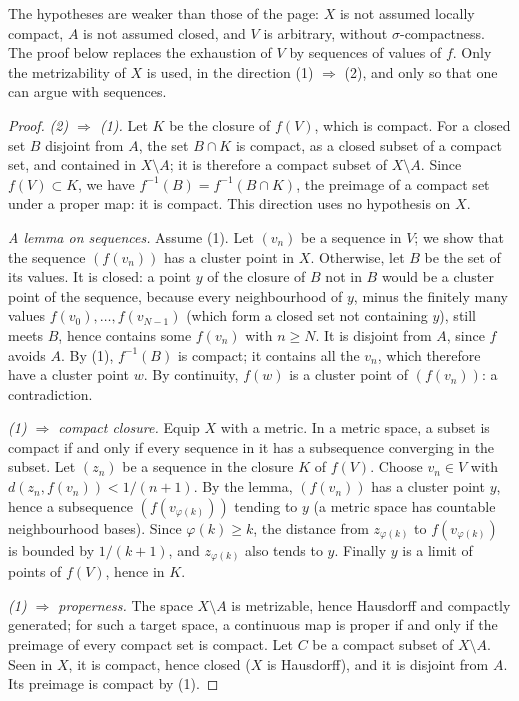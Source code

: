 \noindent The hypotheses are weaker than those of the page: $X$ is not assumed locally compact, $A$ is not assumed closed, and $V$ is arbitrary, without $\sigma$-compactness. The proof below replaces the exhaustion of $V$ by sequences of values of $f$. Only the metrizability of $X$ is used, in the direction (1) $\Rightarrow$ (2), and only so that one can argue with sequences.

\begin{proof}
\emph{(2) $\Rightarrow$ (1).} Let $K$ be the closure of $f(V)$, which is compact. For a closed set $B$ disjoint from $A$, the set $B \cap K$ is compact, as a closed subset of a compact set, and contained in $X \setminus A$; it is therefore a compact subset of $X \setminus A$. Since $f(V) \subset K$, we have $f^{-1}(B) = f^{-1}(B \cap K)$, the preimage of a compact set under a proper map: it is compact. This direction uses no hypothesis on $X$.

\emph{A lemma on sequences.} Assume (1). Let $(v_n)$ be a sequence in $V$; we show that the sequence $(f(v_n))$ has a cluster point in $X$. Otherwise, let $B$ be the set of its values. It is closed: a point $y$ of the closure of $B$ not in $B$ would be a cluster point of the sequence, because every neighbourhood of $y$, minus the finitely many values $f(v_0), \dots, f(v_{N-1})$ (which form a closed set not containing $y$), still meets $B$, hence contains some $f(v_n)$ with $n \ge N$. It is disjoint from $A$, since $f$ avoids $A$. By (1), $f^{-1}(B)$ is compact; it contains all the $v_n$, which therefore have a cluster point $w$. By continuity, $f(w)$ is a cluster point of $(f(v_n))$: a contradiction.

\emph{(1) $\Rightarrow$ compact closure.} Equip $X$ with a metric. In a metric space, a subset is compact if and only if every sequence in it has a subsequence converging in the subset. Let $(z_n)$ be a sequence in the closure $K$ of $f(V)$. Choose $v_n \in V$ with $d(z_n, f(v_n)) < 1/(n+1)$. By the lemma, $(f(v_n))$ has a cluster point $y$, hence a subsequence $(f(v_{\varphi(k)}))$ tending to $y$ (a metric space has countable neighbourhood bases). Since $\varphi(k) \ge k$, the distance from $z_{\varphi(k)}$ to $f(v_{\varphi(k)})$ is bounded by $1/(k+1)$, and $z_{\varphi(k)}$ also tends to $y$. Finally $y$ is a limit of points of $f(V)$, hence in $K$.

\emph{(1) $\Rightarrow$ properness.} The space $X \setminus A$ is metrizable, hence Hausdorff and compactly generated; for such a target space, a continuous map is proper if and only if the preimage of every compact set is compact. Let $C$ be a compact subset of $X \setminus A$. Seen in $X$, it is compact, hence closed ($X$ is Hausdorff), and it is disjoint from $A$. Its preimage is compact by (1).
\end{proof}

